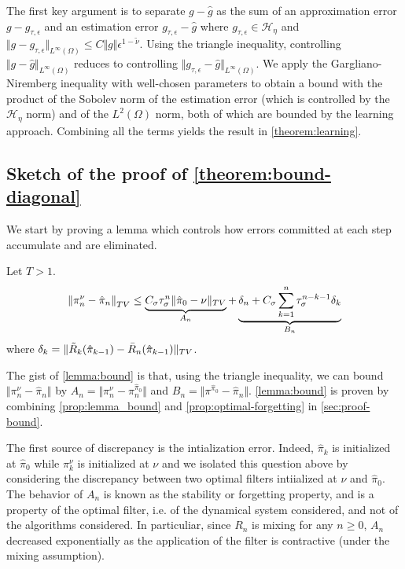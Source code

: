 The first key argument is to separate $g - \hat g$ as the sum of an approximation error $g - g_{\tau, \epsilon}$ and an estimation error $g_{\tau, \epsilon} - \hat g$ where $g_{\tau, \epsilon} \in \mathcal H_\eta$ and $\Vert g - g_{\tau, \epsilon}\Vert_{L^\infty(\Omega)}\leq C \Vert g \Vert \epsilon^{1-\tilde \nu}$. Using the triangle inequality, controlling $\Vert g - \hat g\Vert_{L^\infty(\Omega)}$ reduces to controlling $\Vert g_{\tau, \epsilon} - \hat g\Vert_{L^\infty(\Omega)}$. We apply the Gargliano-Niremberg inequality with well-chosen parameters to obtain a bound with the product of the Sobolev norm of the estimation error (which is controlled by the $\mathcal H_\eta$ norm) and of the $L^2(\Omega)$ norm, both of which are bounded by the learning approach. Combining all the terms yields the result in \cref{theorem:learning}.

\subsection{Sketch of the proof of \cref{theorem:bound-diagonal}}\label{sec:proof-bound-sketch}
We start by proving a lemma which controls how errors committed at each step accumulate and are eliminated.
\begin{lemma}\label{lemma:bound} Let $T > 1$.
    \begin{align}
        \left\Vert \pi_n^\nu - \hat\pi_n\right\Vert_{TV} \leq \underbrace{C_\sigma\tau_\sigma^n\Vert \hat\pi_0 - \nu\Vert_{TV}}_{A_n}+ \underbrace{\delta_n + C_\sigma\sum_{k=1}^n \tau_\sigma^{n-k-1}\delta_k}_{B_n}
    \end{align}
where $\delta_k = \Vert \tilde{{R}}_k(\hat \pi_{k-1}) - \bar R_n(\hat \pi_{k-1})\Vert_{TV}$.
\end{lemma}
%
The gist of \cref{lemma:bound} is that, using the triangle inequality, we can bound $\Vert \pi^\nu_n - \hat\pi_n\Vert$ by $A_n = \Vert\pi^\nu_n - \pi^{\hat \pi_0}_n\Vert$ and $B_n=\Vert\pi^{\hat\pi_0} - \hat \pi_n\Vert$.  \cref{lemma:bound} is proven by combining \cref{prop:lemma_bound} and \cref{prop:optimal-forgetting} in \cref{sec:proof-bound}.

The first source of discrepancy is the intialization error. Indeed, $\hat\pi_k$ is initialized at $\hat \pi_0$ while $\pi_k^\nu$ is initialized at $\nu$ and we isolated this question above by considering the discrepancy between two optimal filters intiialized at $\nu$ and $\hat \pi_0$. The behavior of $A_n$ is known as the stability or forgetting property, and is a property of the optimal filter, i.e. of the dynamical system considered, and not of the algorithms considered. In particuliar, since $R_n$ is mixing for any $n\geq 0$, $A_n$ decreased exponentially as the application of the filter is contractive (under the mixing assumption).

